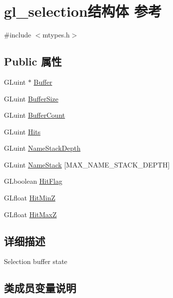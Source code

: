 \hypertarget{structgl__selection}{}\section{gl\+\_\+selection结构体 参考}
\label{structgl__selection}


{\ttfamily \#include $<$mtypes.\+h$>$}

\subsection*{Public 属性}
\begin{DoxyCompactItemize}
\item 
G\+Luint $\ast$ \hyperlink{structgl__selection_ae1c8814bedb5c0250e4618b0d8a926d7}{Buffer}
\item 
G\+Luint \hyperlink{structgl__selection_a1eb0c138dc599871620151702809c466}{Buffer\+Size}
\item 
G\+Luint \hyperlink{structgl__selection_a7a5c7ca249c3a90a012bd9f74f2343ab}{Buffer\+Count}
\item 
G\+Luint \hyperlink{structgl__selection_a0b8cc73baecd7e06f6150a7d1fd71fc4}{Hits}
\item 
G\+Luint \hyperlink{structgl__selection_aff12221c68c88dc88948d880b3b0f09d}{Name\+Stack\+Depth}
\item 
G\+Luint \hyperlink{structgl__selection_aabee9921936832ae81d012da0653db18}{Name\+Stack} \mbox{[}M\+A\+X\+\_\+\+N\+A\+M\+E\+\_\+\+S\+T\+A\+C\+K\+\_\+\+D\+E\+P\+TH\mbox{]}
\item 
G\+Lboolean \hyperlink{structgl__selection_a2b1847c29391d1b032ca341fe9f18832}{Hit\+Flag}
\item 
G\+Lfloat \hyperlink{structgl__selection_a5ff50046757f0b3760695ca08bf0bc6c}{Hit\+MinZ}
\item 
G\+Lfloat \hyperlink{structgl__selection_ab367a422f971bc734cd847fc315376e1}{Hit\+MaxZ}
\end{DoxyCompactItemize}


\subsection{详细描述}
Selection buffer state 

\subsection{类成员变量说明}
\mbox{\label{structgl__selection_ae1c8814bedb5c0250e4618b0d8a926d7}} 
